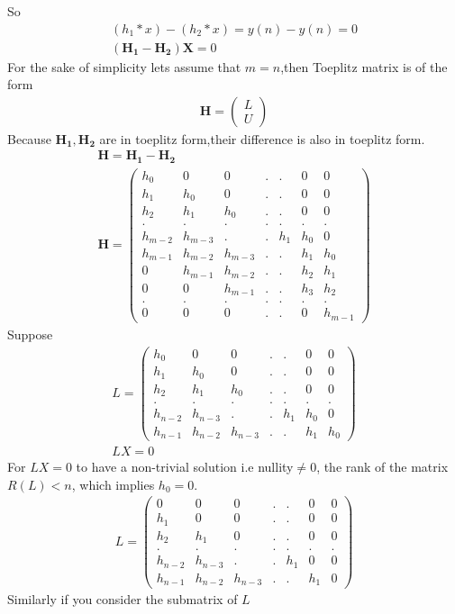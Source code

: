 \documentclass[journal,12pt,twocolumn]{IEEEtran}
\providecommand{\brak}[1]{\ensuremath{\left(#1\right)}}
\newcommand{\myvec}[1]{\ensuremath{\begin{pmatrix}#1\end{pmatrix}}}
\numberwithin{equation}{subsection}
\let\vec\mathbf
\begin{document}
So
\begin{align}
    \brak{h_1\ast x}-\brak{h_2\ast x}=y(n)-y(n)=0\\
    (\vec{H_1}-\vec{H_2})\vec{X}=0
\end{align}
For the sake of simplicity lets assume that $m=n$,then Toeplitz matrix is of the form
\begin{align}
    \vec{H}=\myvec{L\\U}
\end{align}
Because $\vec{H_1},\vec{H_2}$ are in toeplitz form,their difference is also in toeplitz form.
\begin{align}
    \vec{H}=\vec{H_1}-\vec{H_2}\\
    \vec{H}=\myvec{h_0&0&0&.&.&0&0\\h_1&h_0&0&.&.&0&0\\h_2&h_1&h_0&.&.&0&0\\.&.&.&.&.&.&.\\h_{m-2}&h_{m-3}&.&.&h_{1}&h_{0}&0\\h_{m-1}&h_{m-2}&h_{m-3}&.&.&h_{1}&h_{0}\\0&h_{m-1}&h_{m-2}&.&.&h_{2}&h_{1}\\0&0&h_{m-1}&.&.&h_{3}&h_{2}\\.&.&.&.&.&.&.\\0&0&0&.&.&0&h_{m-1}}\label{eq:4}
\end{align}
Suppose \begin{align}
    L=\myvec{h_0&0&0&.&.&0&0\\h_1&h_0&0&.&.&0&0\\h_2&h_1&h_0&.&.&0&0\\.&.&.&.&.&.&.\\h_{n-2}&h_{n-3}&.&.&h_{1}&h_{0}&0\\h_{n-1}&h_{n-2}&h_{n-3}&.&.&h_{1}&h_{0}}\label{eq:5}\\
    LX=0
\end{align}
For $LX=0$ to have a non-trivial solution i.e nullity$\neq 0$, the rank of the matrix $R(L) < n$, which implies $h_0=0$.
\begin{align}
    L=\myvec{0&0&0&.&.&0&0\\h_1&0&0&.&.&0&0\\h_2&h_1&0&.&.&0&0\\.&.&.&.&.&.&.\\h_{n-2}&h_{n-3}&.&.&h_{1}&0&0\\h_{n-1}&h_{n-2}&h_{n-3}&.&.&h_{1}&0}
\end{align}
Similarly if you consider the submatrix of $L$ 
\end{document}
